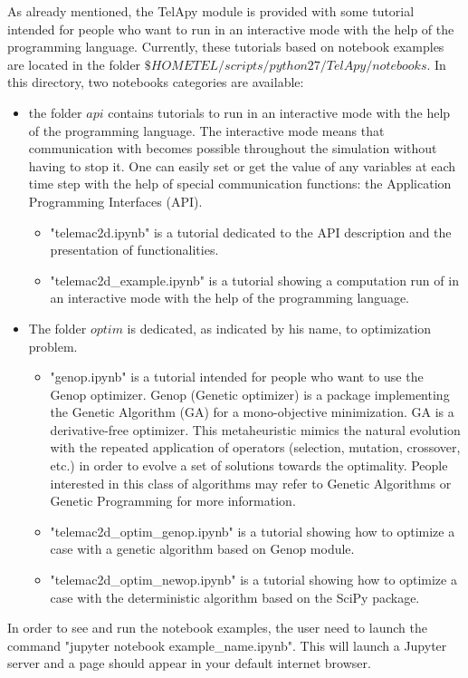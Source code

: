 As already mentioned, the TelApy module is provided with some tutorial intended
for people who want to run  in an interactive mode with the help of
the \python programming language. Currently, these tutorials based on notebook
examples are located in the folder
$\$HOMETEL/scripts/python27/TelApy/notebooks$. In this directory, two notebooks
categories are available:

\begin{itemize}
\item the folder $api$ contains tutorials to run  in an interactive
  mode with the help of the \python programming language. The interactive mode
  means that communication with  becomes possible throughout the
  simulation without having to stop it. One can easily set or get the value of
  any variables at each time step with the help of special communication
  functions: the Application Programming Interfaces (API).
  \begin{itemize}
  \item "telemac2d.ipynb" is a tutorial dedicated to the API description and
    the presentation of  \python functionalities.
   \item "telemac2d\_example.ipynb" is a tutorial showing a computation run of
      in an interactive mode with the help of the \python programming
     language.
  \end{itemize}
\item  The folder $optim$ is dedicated, as indicated by his name, to
  optimization problem.
  \begin{itemize}
  \item "genop.ipynb" is a tutorial intended for people who want to use the
    Genop optimizer. Genop (Genetic optimizer) is a \python package implementing
    the Genetic Algorithm (GA) for a mono-objective minimization. GA is a
    derivative-free optimizer. This metaheuristic mimics the natural evolution
    with the repeated application of operators (selection, mutation, crossover,
    etc.) in order to evolve a set of solutions towards the optimality. People
    interested in this class of algorithms may refer to Genetic Algorithms or
    Genetic Programming for more information.
  \item "telemac2d\_optim\_genop.ipynb" is a tutorial showing how to optimize a
     case with a genetic algorithm based on Genop \python module.
    \item "telemac2d\_optim\_newop.ipynb" is a tutorial showing how to optimize
      a  case with the deterministic algorithm based on the SciPy
      package.
  \end{itemize}
\end{itemize}

In order to see and run the notebook examples, the user need to launch the
command "jupyter notebook example\_name.ipynb". This will launch a Jupyter
server and a page should appear in your default internet browser.
